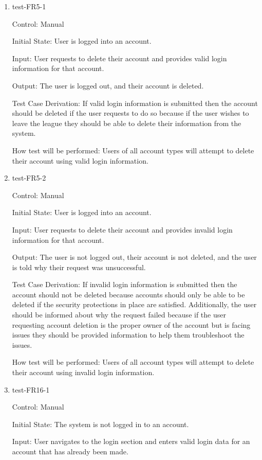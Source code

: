 \documentclass[12pt, titlepage]{article}
\begin{document}
\begin{enumerate}
  \item{test-FR5-1\\}

  Control: Manual

  Initial State: User is logged into an account.

  Input: User requests to delete their account and provides valid login
  information for that account.

  Output: The user is logged out, and their account is deleted.

  Test Case Derivation: If valid login information is submitted then the
  account should be deleted if the user requests to do so because if the user
  wishes to leave the league they should be able to delete their information
  from the system.

  How test will be performed: Users of all account types will attempt to delete
  their account using valid login information.

  \item{test-FR5-2\\}

  Control: Manual

  Initial State: User is logged into an account.

  Input: User requests to delete their account and provides invalid login
  information for that account.

  Output: The user is not logged out, their account is not deleted, and
  the user is told why their request was unsuccessful.

  Test Case Derivation: If invalid login information is submitted then the
  account should not be deleted because accounts should only be able to be
  deleted if the security protections in place are satisfied. Additionally,
  the user should be informed about why the request failed because if the
  user requesting account deletion is the proper owner of the account but is
  facing issues they should be provided information to help them troubleshoot
  the issues.

  How test will be performed: Users of all account types will attempt to delete
  their account using invalid login information.

  \item{test-FR16-1\\}

  Control: Manual

  Initial State: The system is not logged in to an account.

  Input: User navigates to the login section and enters valid login data for
  an account that has already been made.


\end{enumerate}
\end{document}
